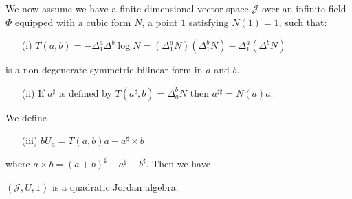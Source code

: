 We now assume we have a finite dimensional vector space $\mathscr{J}$
over an infinite field $\Phi$ equipped with a cubic form $N$, a point
$1$ satisfying $N(1)=1$, such that:
\begin{itemize}
\item[(i)] $T(a,b)=-\Delta_{1}^{a}\Delta^{b}\log N = (\Delta_1^{a} N)
  (\Delta_1^{b}N)-\Delta_1^{a}(\Delta^{b}N)$ 
\end{itemize}
is a non-degenerate symmetric bilinear form in $a$ and $b$.
\begin{itemize}
\item[(ii)] If $a^{\sharp}$ is defined by
  $T(a^{\sharp},b)=\Delta_a^{b}N$ then $a^{\sharp\sharp}=N(a)a$. 
\end{itemize}
We define
\begin{itemize}
\item[(iii)] $bU_a=T(a,b)a-a^{\sharp}\times b$
\end{itemize}
where $a\times b=(a+b)^{\sharp}-a^{\sharp}-b^{\sharp}$. Then  we have 

\begin{thm}\label{c1:thm7}
  $(\mathscr{J}, U, 1)$ is a quadratic Jordan algebra.
\end{thm}

